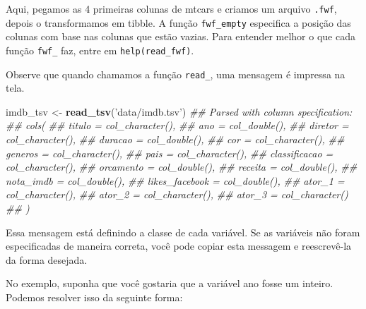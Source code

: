 \documentclass[
]{book}
\newenvironment{Shaded}{\begin{snugshade}}{\end{snugshade}}
\newcommand{\CommentTok}[1]{\textcolor[rgb]{0.56,0.35,0.01}{\textit{#1}}}
\newcommand{\KeywordTok}[1]{\textcolor[rgb]{0.13,0.29,0.53}{\textbf{#1}}}
\newcommand{\NormalTok}[1]{#1}
\newcommand{\StringTok}[1]{\textcolor[rgb]{0.31,0.60,0.02}{#1}}
\begin{document}
Aqui, pegamos as 4 primeiras colunas de mtcars e criamos um arquivo \texttt{.fwf}, depois o transformamos em tibble. A função \texttt{fwf\_empty} especifica a posição das colunas com base nas colunas que estão vazias. Para entender melhor o que cada função \texttt{fwf\_} faz, entre em \texttt{help(read\_fwf)}.

Observe que quando chamamos a função \texttt{read\_}, uma mensagem é impressa na tela.

\begin{Shaded}
\begin{Highlighting}[]
\NormalTok{imdb_tsv <-}\StringTok{ }\KeywordTok{read_tsv}\NormalTok{(}\StringTok{'data/imdb.tsv'}\NormalTok{)}
\CommentTok{## Parsed with column specification:}
\CommentTok{## cols(}
\CommentTok{##   titulo = col_character(),}
\CommentTok{##   ano = col_double(),}
\CommentTok{##   diretor = col_character(),}
\CommentTok{##   duracao = col_double(),}
\CommentTok{##   cor = col_character(),}
\CommentTok{##   generos = col_character(),}
\CommentTok{##   pais = col_character(),}
\CommentTok{##   classificacao = col_character(),}
\CommentTok{##   orcamento = col_double(),}
\CommentTok{##   receita = col_double(),}
\CommentTok{##   nota_imdb = col_double(),}
\CommentTok{##   likes_facebook = col_double(),}
\CommentTok{##   ator_1 = col_character(),}
\CommentTok{##   ator_2 = col_character(),}
\CommentTok{##   ator_3 = col_character()}
\CommentTok{## )}
\end{Highlighting}
\end{Shaded}

Essa mensagem está definindo a classe de cada variável. Se as variáveis não foram especificadas de maneira correta, você pode copiar esta messagem e reescrevê-la da forma desejada.

No exemplo, suponha que você gostaria que a variável ano fosse um inteiro. Podemos resolver isso da seguinte forma:
\end{document}
